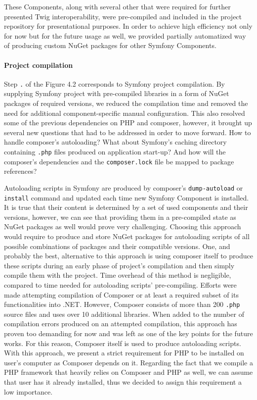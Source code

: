 These Components, along with several other that were required for further presented Twig interoperability, were pre-compiled and included in the project repository for presentational purposes. In order to achieve high efficiency not only for now but for the future usage as well, we provided partially automatized way of producing custom NuGet packages for other Symfony Components.

\paragraph{Project compilation} Step \texttt{.} of the Figure 4.2 corresponds to Symfony project compilation. By supplying Symfony project with pre-compiled libraries in a form of NuGet packages of required versions, we reduced the compilation time and removed the need for additional component-specific manual configuration. This also resolved some of the previous dependencies on PHP and composer, however, it brought up several new questions that had to be addressed in order to move forward. How to handle composer's autoloading? What about Symfony's caching directory containing \texttt{.php} files produced on application start-up? And how will the composer's dependencies and the \texttt{composer.lock} file be mapped to package references?

Autoloading scripts in Symfony are produced by composer's \texttt{dump-autoload} or \texttt{install} command and updated each time new Symfony Component is installed. It is true that their content is determined by a set of used components and their versions, however, we can see that providing them in a pre-compiled state as NuGet packages as well would prove very challenging. Choosing this approach would require to produce and store NuGet packages for autoloading scripts of all possible combinations of packages and their compatible versions. One, and probably the best, alternative to this approach is using composer itself to produce these scripts during an early phase of project's compilation and then simply compile them with the project. Time overhead of this method is negligible, compared to time needed for autoloading scripts' pre-compiling. Efforts were made attempting compilation of Composer or at least a required subset of its functionalities into .NET. However, Composer consists of more than 200 \texttt{.php} source files and uses over 10 additional libraries. When added to the number of compilation errors produced on an attempted compilation, this approach has proven too demanding for now and was left as one of the key points for the future works. For this reason, Composer itself is used to produce autoloading scripts. With this approach, we present a strict requirement for PHP to be installed on user's computer as Composer depends on it. Regarding the fact that we compile a PHP framework that heavily relies on Composer and PHP as well, we can assume that user has it already installed, thus we decided to assign this requirement a low importance.

